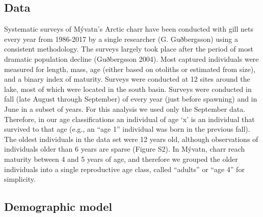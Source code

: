 \subsection*{Data} 

Systematic surveys of Mývatn’s Arctic charr have been conducted 
with gill nets every year from 1986-2017 by a single researcher (G. Guðbergsson) 
using a consistent methodology. 
The surveys largely took place after the period of most dramatic population decline 
(Guðbergsson 2004). Most captured individuals were measured for length, mass, 
age (either based on otoliths or estimated from size), and a binary index of maturity. 
Surveys were conducted at 12 sites around the lake, 
most of which were located in the south basin. 
Surveys were conducted in fall (late August through September) 
of every year (just before spawning) and in June in a subset of years. 
For this analysis we used only the September data. 
Therefore, in our age classifications an individual of age ‘x’ is an individual 
that survived to that age (e.g., an “age 1” individual was born in the previous fall). 
The oldest individuals in the data set were 12 years old, although observations 
of individuals older than 6 years are sparse (Figure S2). 
In Mývatn, charr reach maturity between 4 and 5 years of age, 
and therefore we grouped the older individuals into a single reproductive age class, 
called “adults” or “age 4” for simplicity.

\subsection*{Demographic model} 


